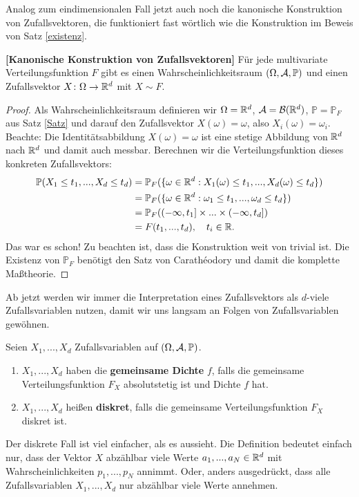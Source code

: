 Analog zum eindimensionalen Fall jetzt auch noch die kanonische Konstruktion von Zufallsvektoren, die funktioniert fast w\"ortlich wie die Konstruktion im Beweis von Satz \ref{existenz}.
\begin{satz}\label{kan}
 \textbf{[Kanonische Konstruktion von Zufallsvektoren]}
	Für jede multivariate Verteilungsfunktion $F$ gibt es einen Wahrscheinlichkeitsraum $(\Omega, \mathcal{A}, \mathbb{P})$ und einen Zufallsvektor $X \colon \Omega \to \mathbb{R}^d$ mit $X \sim F$.
\end{satz}
\begin{proof}
	Als Wahrscheinlichkeitsraum definieren wir $\Omega=\mathbb{R}^d$, $\mathcal{A} = \mathcal{B}(\mathbb{R}^d)$, $\mathbb{P} = \mathbb{P}_F$ aus Satz \ref{Satz} und darauf den Zufallsvektor $X(\omega) = \omega$, also $X_i(\omega)=\omega_i$. Beachte: Die Identit\"atsabbildung $X(\omega)=\omega$ ist eine stetige Abbildung von $\mathbb{R}^d$ nach $\mathbb{R}^d$ und damit auch messbar. Berechnen wir die Verteilungsfunktion dieses konkreten Zufallsvektors:
	\begin{align*} 
		\mathbb{P}(X_1\leq t_1, ..., X_d\leq t_d) 
		&=	\mathbb{P}_F(\{\omega \in \mathbb{R}^d: X_1(\omega) \leq t_1, ..., X_d(\omega)\leq t_d\})\\
		&=\mathbb{P}_F(\{\omega \in \mathbb{R}^d: \omega_1\leq t_1, ..., \omega_d\leq t_d\})\\
		&=\mathbb P_F((-\infty,t_1]\times...\times (-\infty,t_d])\\
		&=F(t_1,...,t_d),\quad t_i\in\mathbb{R}.
 \end{align*} 
	Das war es schon! Zu beachten ist, dass die Konstruktion weit von trivial ist. Die Existenz von $\mathbb P_F$ ben\"otigt den Satz von Carath\'eodory und damit die komplette Ma\ss theorie. 
\end{proof}
Ab jetzt werden wir immer die Interpretation eines Zufallsvektors als $d$-viele Zufallsvariablen nutzen, damit wir uns langsam an Folgen von Zufallsvariablen gew\"ohnen. 
\begin{deff}
	Seien $X_1,...,X_d$ Zufallsvariablen auf $(\Omega, \mathcal{A}, \mathbb{P})$.
	\begin{enumerate}[label=(\roman*)]
		\item $X_1,...,X_d$ haben die \textbf{gemeinsame Dichte} $f$, falls die gemeinsame Verteilungsfunktion $F_X$ absolutstetig ist und Dichte $f$ hat.
		\item $X_1,...,X_d$ heißen \textbf{diskret}, falls die gemeinsame Verteilungsfunktion $F_X$ diskret ist.	\end{enumerate}
\end{deff}
Der diskrete Fall ist viel einfacher, als es aussieht. Die Definition bedeutet einfach nur, dass der Vektor $X$ abz\"ahlbar viele Werte $a_1,...,a_N \in \mathbb{R}^d$ mit Wahrscheinlichkeiten $p_1,...,p_N$ annimmt. Oder, anders ausgedr\"uckt, dass alle Zufallsvariablen $X_1,...,X_d$ nur abz\"ahlbar viele Werte annehmen.
\smallskip

